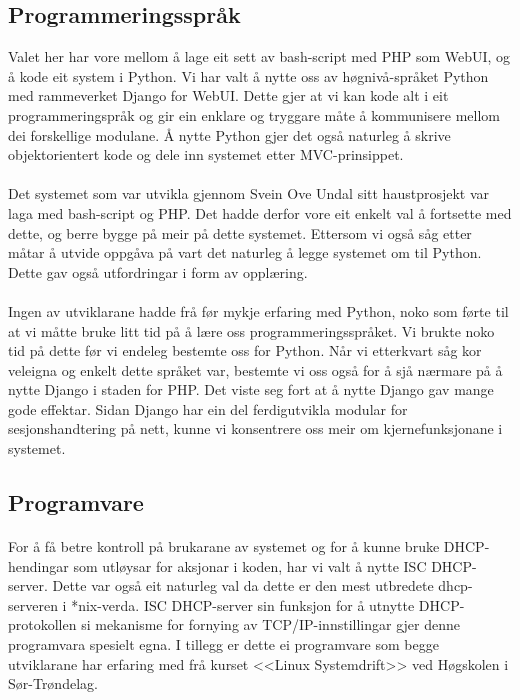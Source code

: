 \documentclass[nynorsk,12pt,a4paper,oneside]{book}
\begin{document}
\subsection{Programmeringsspråk}
Valet her har vore mellom å lage eit sett av bash-script med PHP som WebUI, og å kode eit system i Python. Vi har valt å nytte oss av høgnivå-språket Python med rammeverket Django for WebUI. Dette gjer at vi kan kode alt i eit programmeringspråk og gir ein enklare og tryggare måte å kommunisere mellom dei forskellige modulane. Å nytte Python gjer det også naturleg å skrive objektorientert kode og dele inn systemet etter MVC-prinsippet. 
\paragraph{}
Det systemet som var utvikla gjennom Svein Ove Undal sitt haustprosjekt var laga med bash-script og PHP. Det hadde derfor vore eit enkelt val å fortsette med dette, og berre bygge på meir på dette systemet. Ettersom vi også såg etter måtar å utvide oppgåva på vart det naturleg å legge systemet om til Python. Dette gav også utfordringar i form av opplæring.
\paragraph{}
Ingen av utviklarane hadde frå før mykje erfaring med Python, noko som førte til at vi måtte bruke litt tid på å lære oss programmeringsspråket. Vi brukte noko tid på dette før vi endeleg bestemte oss for Python. Når vi etterkvart såg kor veleigna og enkelt dette språket var, bestemte vi oss også for å sjå nærmare på å nytte Django i staden for PHP. Det viste seg fort at å nytte Django gav mange gode effektar. Sidan Django har ein del ferdigutvikla modular for sesjonshandtering på nett, kunne vi konsentrere oss meir om kjernefunksjonane i systemet.

\subsection{Programvare}
\paragraph{}
For å få betre kontroll på brukarane av systemet og for å kunne bruke DHCP-hendingar som utløysar for aksjonar i koden, har vi valt å nytte ISC DHCP-server. Dette var også eit naturleg val da dette er den mest utbredete dhcp-serveren i *nix-verda. ISC DHCP-server sin funksjon for å utnytte DHCP-protokollen si mekanisme for fornying av TCP/IP-innstillingar gjer denne programvara spesielt egna. I tillegg er dette ei programvare som begge utviklarane har erfaring med frå kurset <<Linux Systemdrift>> ved Høgskolen i Sør-Trøndelag. 
\end{document}

